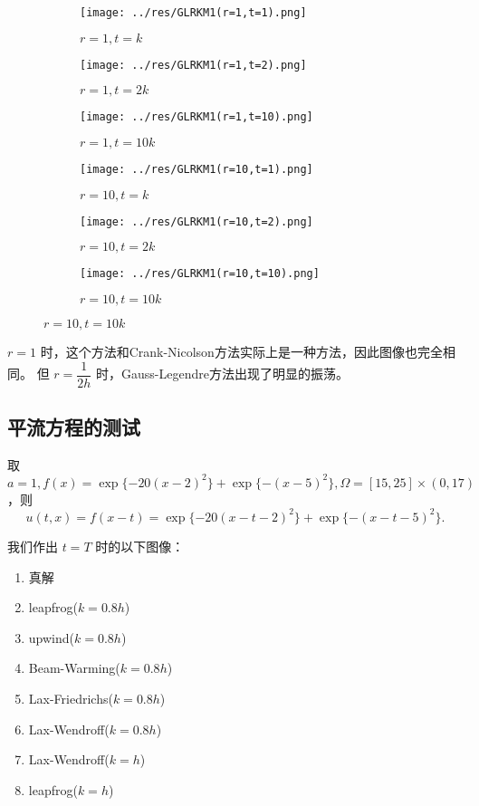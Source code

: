 \documentclass[lang=cn,a4paper,newtx,bibend=bibtex]{elegantpaper}
\begin{document}
\begin{figure}[H]
    \centering
    \begin{subfigure}[b]{0.30\textwidth}
        \texttt{[image: ../res/GLRKM1(r=1,t=1).png]}
        \caption{$r=1, t=k$}
    \end{subfigure}
    \hfill
    \begin{subfigure}[b]{0.30\textwidth}
        \texttt{[image: ../res/GLRKM1(r=1,t=2).png]}
        \caption{$r=1, t=2k$}
    \end{subfigure}
    \hfill
    \begin{subfigure}[b]{0.30\textwidth}
        \texttt{[image: ../res/GLRKM1(r=1,t=10).png]}
        \caption{$r=1, t=10k$}
    \end{subfigure}
    \begin{subfigure}[b]{0.30\textwidth}
        \texttt{[image: ../res/GLRKM1(r=10,t=1).png]}
        \caption{$r=10, t=k$}
    \end{subfigure}
    \hfill
    \begin{subfigure}[b]{0.30\textwidth}
        \texttt{[image: ../res/GLRKM1(r=10,t=2).png]}
        \caption{$r=10, t=2k$}
    \end{subfigure}
    \hfill
    \begin{subfigure}[b]{0.30\textwidth}
        \texttt{[image: ../res/GLRKM1(r=10,t=10).png]}
        \caption{$r=10, t=10k$}
    \end{subfigure}
  \end{figure}

$r=1$ 时，这个方法和Crank-Nicolson方法实际上是一种方法，因此图像也完全相同。
但 $r=\dfrac 1{2h}$ 时，Gauss-Legendre方法出现了明显的振荡。

\subsection{平流方程的测试}

取 $a=1, f(x) = \exp\{-20(x-2)^2\}+\exp\{-(x-5)^2\}, \Omega = [15,25]\times (0,17)$，则
\begin{equation}
    u(t,x) = f(x-t) = \exp\{-20(x-t-2)^2\} + \exp\{-(x-t-5)^2\}.
\end{equation}

我们作出 $t=T$ 时的以下图像：
\begin{enumerate}
    \item 真解
    \item leapfrog($k=0.8h$)
    \item upwind($k=0.8h$)
    \item Beam-Warming($k=0.8h$)
    \item Lax-Friedrichs($k=0.8h$)
    \item Lax-Wendroff($k=0.8h$)
    \item Lax-Wendroff($k=h$)
    \item leapfrog($k=h$)
\end{enumerate}
\end{document}
